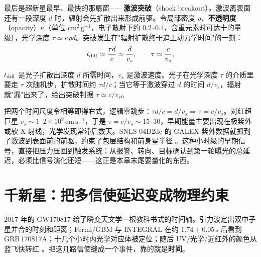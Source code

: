 最后是超新星最早、最快的那扇窗——\textbf{激波突破}（shock breakout）。激波离表面还有一段深度 \(d\) 时，辐射会先扩散出来形成前驱。令局部密度 \(\rho\)、\textbf{不透明度}（opacity）\(\kappa\)（单位 \(\mathrm{cm^2\,g^{-1}}\)，电子散射下约 \(0.2\text{--}0.4\)，含重元素时可达十的量级），光学深度 \(\tau\simeq\kappa\rho d\)。突破发生在"辐射扩散终于追上动力学时间"的一刻：
\begin{equation}
  t_{\rm diff}\simeq \frac{\tau d}{c}\simeq \frac{d}{v_s},
  \qquad
  \tau\simeq \frac{c}{v_s},
  \label{eq:e20-shock-breakout-condition}
\end{equation}
\begin{formulaexplain}
\(t_{\rm diff}\) 是光子扩散出深度 \(d\) 所需时间，\(v_s\) 是激波速度。光子在光学深度 \(\tau\) 的介质里要走 \(\tau\) 次随机步，扩散时间约 \(\tau d/c\)；当它等于激波穿过 \(d\) 的时间 \(d/v_s\)，辐射就"漏"出来了，给出突破判据 \(\tau\simeq c/v_s\)。
\end{formulaexplain}
把两个时间尺度令相等即得右式，逻辑零跳步：\(\tau d/c = d/v_s\Rightarrow\tau=c/v_s\)。对红超巨星 \(v_s\sim1\text{--}2\times10^9\,\mathrm{cm\,s^{-1}}\)，于是 \(\tau=c/v_s\sim15\text{--}30\)，早期能量主要出现在极紫外或软 X 射线，光学发现常滞后数天。SNLS-04D2dc 的 GALEX 紫外数据就抓到了激波到表面前的前驱，约束了包层结构和前身星半径 \citep{2008Sci...321..223S,2011ApJ...727..104C}。这种小时级的早期信号，直接把压力压回到触发系统：从报警、转向、目标确认到第一轮曝光的总延迟，必须比信号演化还短——这正是本章末尾要量化的东西。

\section{千新星：把多信使延迟变成物理约束}
\label{sec:e20-kilonova}

2017 年的 GW170817 给了瞬变天文学一根教科书式的时间轴。引力波定出双中子星并合的时刻和距离；Fermi/GBM 与 INTEGRAL 在约 \(1.74\pm0.05\,\mathrm{s}\) 后看到 GRB\,170817A；十几个小时内光学对应体被定位；随后 UV/光学/近红外的颜色从蓝飞快转红 \citep{2017PhRvL.119p1101A,2017ApJ...848L..13A,2017ApJ...848L..12A,2017ApJ...848L..17C,2017Natur.551...75S}。把这几路信使缝成一个事件，靠的就是\textbf{时间}。

